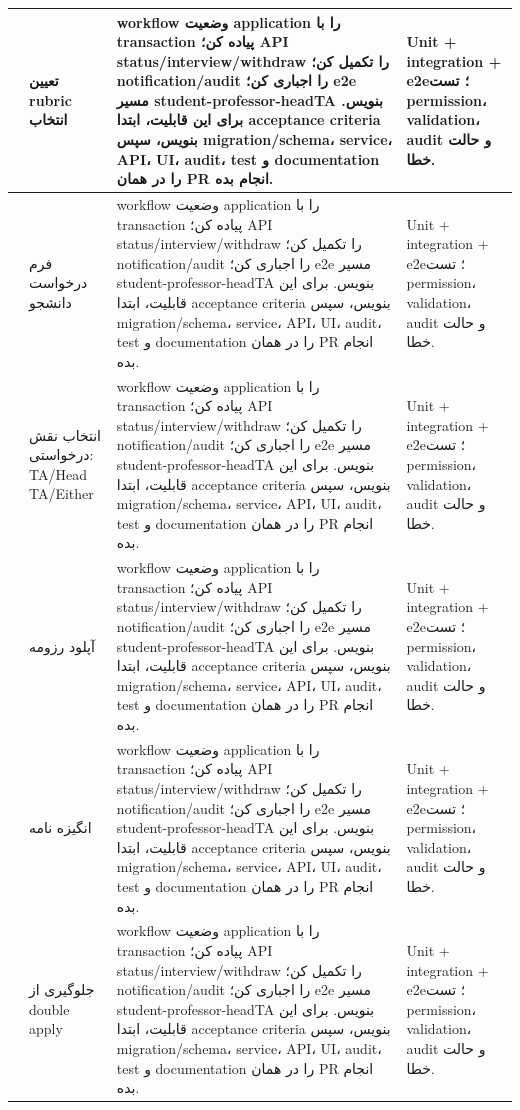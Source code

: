\documentclass[11pt,a4paper]{article}
\begin{document}
\begin{longtable}{|>{\raggedleft\arraybackslash}p{}|>{\raggedleft\arraybackslash}p{}|>{\raggedleft\arraybackslash}p{}|>{\raggedleft\arraybackslash}p{}|}
56 & تعیین rubric انتخاب & workflow وضعیت application را با transaction پیاده کن؛ API status/interview/withdraw را تکمیل کن؛ notification/audit را اجباری کن؛ e2e مسیر student-professor-headTA بنویس. برای این قابلیت، ابتدا acceptance criteria بنویس، سپس migration/schema، service، API، UI، audit، test و documentation را در همان PR انجام بده. & Unit + integration + e2e؛ تست permission، validation، audit و حالت خطا. \\ \hline
57 & فرم درخواست دانشجو & workflow وضعیت application را با transaction پیاده کن؛ API status/interview/withdraw را تکمیل کن؛ notification/audit را اجباری کن؛ e2e مسیر student-professor-headTA بنویس. برای این قابلیت، ابتدا acceptance criteria بنویس، سپس migration/schema، service، API، UI، audit، test و documentation را در همان PR انجام بده. & Unit + integration + e2e؛ تست permission، validation، audit و حالت خطا. \\ \hline
58 & انتخاب نقش درخواستی: TA/Head TA/Either & workflow وضعیت application را با transaction پیاده کن؛ API status/interview/withdraw را تکمیل کن؛ notification/audit را اجباری کن؛ e2e مسیر student-professor-headTA بنویس. برای این قابلیت، ابتدا acceptance criteria بنویس، سپس migration/schema، service، API، UI، audit، test و documentation را در همان PR انجام بده. & Unit + integration + e2e؛ تست permission، validation، audit و حالت خطا. \\ \hline
59 & آپلود رزومه & workflow وضعیت application را با transaction پیاده کن؛ API status/interview/withdraw را تکمیل کن؛ notification/audit را اجباری کن؛ e2e مسیر student-professor-headTA بنویس. برای این قابلیت، ابتدا acceptance criteria بنویس، سپس migration/schema، service، API، UI، audit، test و documentation را در همان PR انجام بده. & Unit + integration + e2e؛ تست permission، validation، audit و حالت خطا. \\ \hline
60 & انگیزه نامه & workflow وضعیت application را با transaction پیاده کن؛ API status/interview/withdraw را تکمیل کن؛ notification/audit را اجباری کن؛ e2e مسیر student-professor-headTA بنویس. برای این قابلیت، ابتدا acceptance criteria بنویس، سپس migration/schema، service، API، UI، audit، test و documentation را در همان PR انجام بده. & Unit + integration + e2e؛ تست permission، validation، audit و حالت خطا. \\ \hline
61 & جلوگیری از double apply & workflow وضعیت application را با transaction پیاده کن؛ API status/interview/withdraw را تکمیل کن؛ notification/audit را اجباری کن؛ e2e مسیر student-professor-headTA بنویس. برای این قابلیت، ابتدا acceptance criteria بنویس، سپس migration/schema، service، API، UI، audit، test و documentation را در همان PR انجام بده. & Unit + integration + e2e؛ تست permission، validation، audit و حالت خطا. \\ \hline

\end{longtable}
\end{document}
